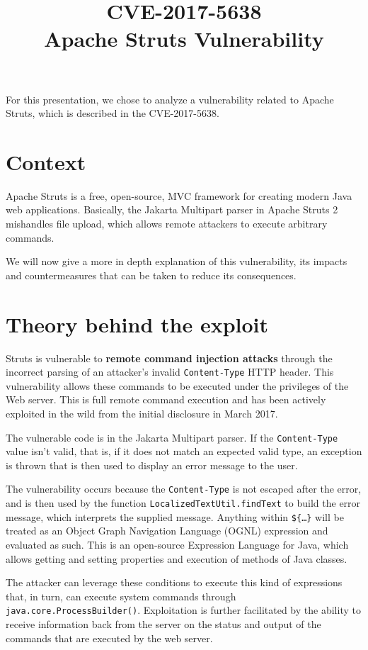 \documentclass[a4paper, 11pt]{article}
\title{CVE-2017-5638 \\ [0.8em] \smaller Apache Struts Vulnerability}
\author{}
\date{}
\begin{document}
\maketitle

For this presentation, we chose to analyze a vulnerability related to Apache Struts, which is described
in the CVE-2017-5638.

\section{Context}

Apache Struts is a free, open-source, MVC framework for creating modern Java web applications. Basically,
the Jakarta Multipart parser in Apache Struts 2 mishandles file upload, which allows remote attackers
to execute arbitrary commands. 

We will now give a more in depth explanation of this vulnerability, its impacts and countermeasures that
can be taken to reduce its consequences.

\section{Theory behind the exploit}

Struts is vulnerable to \textbf{remote command injection attacks} through the incorrect parsing of an
attacker's invalid \texttt{Content-Type} HTTP header. This vulnerability allows these commands to be
executed under the privileges of the Web server. This is full remote command execution and has been
actively exploited in the wild from the initial disclosure in March 2017.

The vulnerable code is in the Jakarta Multipart parser. If the \texttt{Content-Type} value isn't valid,
that is, if it does not match an expected valid type, an exception is thrown that is then used to display
an error message to the user.

The vulnerability occurs because the \texttt{Content-Type} is not escaped after the error, and is then used
by the function \texttt{LocalizedTextUtil.findText} to build the error message, which interprets the supplied
message. Anything within \texttt{\$\{…\}} will be treated as an Object Graph Navigation Language (OGNL)
expression and evaluated as such. This is an open-source Expression Language for Java, which allows
getting and setting properties and execution of methods of Java classes. 

The attacker can leverage these conditions to execute this kind of expressions that, in turn, can execute
system commands through \texttt{java.core.ProcessBuilder()}. Exploitation is further facilitated by the
ability to receive information back from the server on the status and output of the commands that are
executed by the web server.
\end{document}
